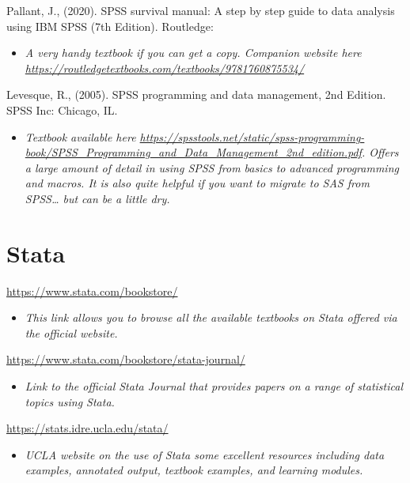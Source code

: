 \documentclass[
]{book}
\providecommand{\tightlist}{%
  \setlength{\itemsep}{0pt}\setlength{\parskip}{0pt}}
\begin{document}
Pallant, J., (2020). SPSS survival manual: A step by step guide to data analysis using IBM SPSS (7th Edition). Routledge:

\begin{itemize}
\tightlist
\item
  \emph{A very handy textbook if you can get a copy. Companion website here \url{https://routledgetextbooks.com/textbooks/9781760875534/}}
\end{itemize}

Levesque, R., (2005). SPSS programming and data management, 2nd Edition. SPSS Inc: Chicago, IL.

\begin{itemize}
\tightlist
\item
  \emph{Textbook available here \url{https://spsstools.net/static/spss-programming-book/SPSS_Programming_and_Data_Management_2nd_edition.pdf}. Offers a large amount of detail in using SPSS from basics to advanced programming and macros. It is also quite helpful if you want to migrate to SAS from SPSS\ldots{} but can be a little dry.}
\end{itemize}

\hypertarget{stata}{%
\section{Stata}\label{stata}}

\url{https://www.stata.com/bookstore/}

\begin{itemize}
\tightlist
\item
  \emph{This link allows you to browse all the available textbooks on Stata offered via the official website.}
\end{itemize}

\url{https://www.stata.com/bookstore/stata-journal/}

\begin{itemize}
\tightlist
\item
  \emph{Link to the official Stata Journal that provides papers on a range of statistical topics using Stata.}
\end{itemize}

\url{https://stats.idre.ucla.edu/stata/}

\begin{itemize}
\tightlist
\item
  \emph{UCLA website on the use of Stata some excellent resources including data examples, annotated output, textbook examples, and learning modules.}
\end{itemize}
\end{document}
